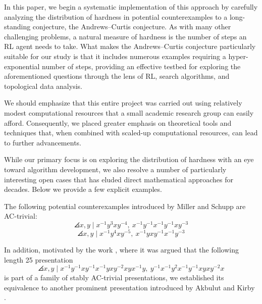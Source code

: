 In this paper, we begin a systematic implementation of this approach by carefully analyzing the distribution of hardness in potential counterexamples to a long-standing conjecture, the Andrews--Curtis conjecture. As with many other challenging problems, a natural measure of hardness is the number of steps an RL agent needs to take. What makes the Andrews--Curtis conjecture particularly suitable for our study is that it includes numerous examples requiring a hyper-exponential number of steps, providing an effective testbed for exploring the aforementioned questions through the lens of RL, search algorithms, and topological data analysis.

We should emphasize that this entire project was carried out using relatively modest computational resources that a small academic research group can easily afford. Consequently, we placed greater emphasis on theoretical tools and techniques that, when combined with scaled-up computational resources, can lead to further advancements.

While our primary focus is on exploring the distribution of hardness with an eye toward algorithm development, we also resolve a number of particularly interesting open cases that has eluded direct mathematical approaches for decades. Below we provide a few explicit examples.

\begin{theorem}\label{thm:MS}
The following potential counterexamples introduced by Miller and Schupp \cite{Miller--Schupp} are AC-trivial:
\begin{equation}
\angles{x, y \mid x^{-1} y^3 x y^{-4} , \ x^{-1} y^{-1} x^{-1} y^{-1} x y^{-3} }
\end{equation}
\begin{equation}
\angles{x, y \mid x^{-1} y^4 x y^{-5} , \ x^{-1} y x y^{-1} x^{-1} y^{-3} }
\end{equation}
\end{theorem}

\medskip\noindent
In addition, motivated by the work \cite{MMS}, where it was argued that the following length 25 presentation
\begin{equation}\label{eq:MMS3}
\angles{ x, y \mid
	x^{-1}y^{-1}xy^{-1}x^{-1}yxy^{-2}xyx^{-1}y, \
	y^{-1}x^{-1}y^2x^{-1}y^{-1}xyxy^{-2}x }
\end{equation}
is part of a family of stably AC-trivial presentations, we established its equivalence to another prominent presentation introduced by Akbulut and Kirby \cite{Akbulut--Kirby}.

